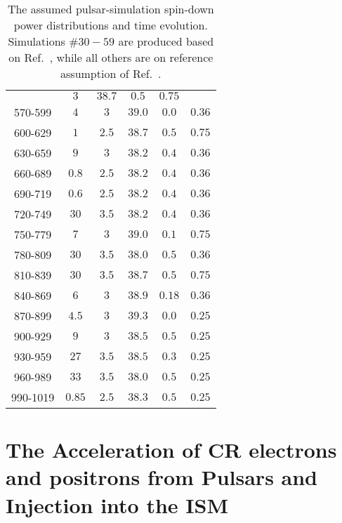 \documentclass[aps,prd,twocolumn,amsmath,superscriptaddress,amssymb,showpacs,floatfix,nofootinbib]{revtex4-1}
\begin{document}
\begin{appendix}
\begin{table}[t]
\begin{tabular}{c | *{5}{c}}
		& $3$ 	
		& $38.7$ 	
		& $0.5$ 	
		& $0.75$ 	 	
		\\
		570-599
		& $4$ 	
		& $3$ 	
		& $39.0$ 	
		& $0.0$ 	
		& $0.36$ 		
		\\
		600-629 	
		& $1$ 	
		& $2.5$ 	
		& $38.7$ 	
		& $0.5$ 	
		& $0.75$ 	
		\\
		630-659
		& $9$ 	
		& $3$ 	
		& $38.2$ 	
		& $0.4$ 	
		& $0.36$ 	
		\\
		660-689
		& $0.8$ 	
		& $2.5$ 	
		& $38.2$ 	
		& $0.4$ 	
		& $0.36$ 	
		\\
		690-719
		& $0.6$ 	
		& $2.5$ 	
		& $38.2$ 	
		& $0.4$ 	
		& $0.36$ 	
		\\
		720-749
		& $30$ 	
		& $3.5$ 	
		& $38.2$ 	
		& $0.4$ 	
		& $0.36$ 	
		\\
		750-779
		& $7$ 	
		& $3$ 	
		& $39.0$ 	
		& $0.1$ 	
		& $0.75$ 	
		\\
		780-809
		& $30$ 	
		& $3.5$ 	
		& $38.0$ 	
		& $0.5$ 	
		& $0.36$ 		
		\\
		810-839 	
		& $30$ 	
		& $3.5$ 	
		& $38.7$ 	
		& $0.5$ 	
		& $0.75$ 	 	
		\\
		840-869
		& $6$ 	
		& $3$ 	
		& $38.9$ 	
		& $0.18$ 	
		& $0.36$ 	 	
		\\
		870-899
		& $4.5$ 	
		& $3$ 	
		& $39.3$ 	
		& $0.0$ 	
		& $0.25$ 	 	
		\\
		900-929
		& $9$ 	
		& $3$ 	
		& $38.5$ 	
		& $0.5$ 	
		& $0.25$ 	 	
		\\
		930-959
		& $27$ 	
		& $3.5$ 	
		& $38.5$ 	
		& $0.3$ 	
		& $0.25$ 	
	         \\
		960-989
		& $33$ 	
		& $3.5$ 	
		& $38.0$ 	
		& $0.5$ 	
		& $0.25$ 	
		\\
		990-1019
		& $0.85$ 	
		& $2.5$ 	
		& $38.3$ 	
		& $0.5$ 	
		& $0.25$ 	
		\\

	\end{tabular}
	\caption{The assumed pulsar-simulation spin-down power
        distributions and time evolution. Simulations $\# 30-59$
        are produced based on Ref.~\cite{Lorimer:2003qc},
	while all others are on reference assumption of
        Ref.~\cite{Lorimer:2006qs}.}
	\label{tab:PulsarsSim}
\end{table}

\section{The Acceleration of CR electrons and positrons from Pulsars and Injection into the ISM}
\label{appC}


\end{appendix}
\end{document}
